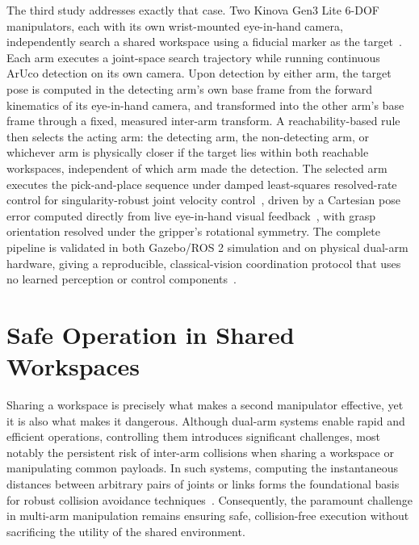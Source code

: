 The third study addresses exactly that case. Two Kinova Gen3 Lite 6-DOF manipulators, each with its own wrist-mounted eye-in-hand camera, independently search a shared workspace using a fiducial marker as the target~\citep{garrido2014automatic}. Each arm executes a joint-space search trajectory while running continuous ArUco detection on its own camera. Upon detection by either arm, the target pose is computed in the detecting arm's own base frame from the forward kinematics of its eye-in-hand camera, and transformed into the other arm's base frame through a fixed, measured inter-arm transform. A reachability-based rule then selects the acting arm: the detecting arm, the non-detecting arm, or whichever arm is physically closer if the target lies within both reachable workspaces, independent of which arm made the detection. The selected arm executes the pick-and-place sequence under damped least-squares resolved-rate control for singularity-robust joint velocity control~\citep{nakamura1986inverse,chiaverini1994review}, driven by a Cartesian pose error computed directly from live eye-in-hand visual feedback~\citep{hutchinson1996tutorial}, with grasp orientation resolved under the gripper's rotational symmetry. The complete pipeline is validated in both Gazebo/ROS 2 simulation and on physical dual-arm hardware, giving a reproducible, classical-vision coordination protocol that uses no learned perception or control components~\citep{sk2025sharedvision}.

\section{Safe Operation in Shared Workspaces}\label{sec:intro_safety}

Sharing a workspace is precisely what makes a second manipulator effective, yet it is also what makes it dangerous. Although dual-arm systems enable rapid and efficient operations, controlling them introduces significant challenges, most notably the persistent risk of inter-arm collisions when sharing a workspace or manipulating common payloads. In such systems, computing the instantaneous distances between arbitrary pairs of joints or links forms the foundational basis for robust collision avoidance techniques~\citep{lin1993efficient}. Consequently, the paramount challenge in multi-arm manipulation remains ensuring safe, collision-free execution without sacrificing the utility of the shared environment.


